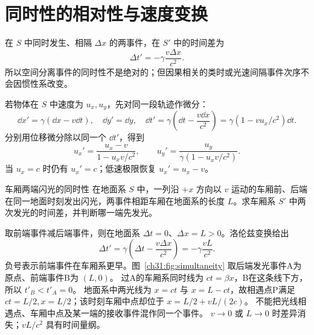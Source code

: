 
\section{同时性的相对性与速度变换}

在 $S$ 中同时发生、相隔 $\Delta x$ 的两事件，在 $S'$ 中的时间差为
\begin{equation}
 \Delta t'=-\gamma\frac{v\Delta x}{c^2}.
\end{equation}
所以空间分离事件的同时性不是绝对的；但因果相关的类时或光速间隔事件次序不会因惯性系改变。

若物体在 $S$ 中速度为 $u_x,u_y$，先对同一段轨迹作微分：
\[
 \dd x'=\gamma(\dd x-v\dd t),\quad
 \dd y'=\dd y,\quad
 \dd t'=\gamma\left(\dd t-\frac{v\dd x}{c^2}\right)
 =\gamma(1-vu_x/c^2)\dd t.
\]
分别用位移微分除以同一个 $\dd t'$，得到
\begin{equation}
 u_x'=\frac{u_x-v}{1-u_xv/c^2},\qquad
 u_y'=\frac{u_y}{\gamma(1-u_xv/c^2)}.
\end{equation}
当 $u_x=c$ 时仍有 $u_x'=c$；低速极限恢复 $u_x'=u_x-v$。

\begin{origexamplebox}{车厢两端闪光的同时性}
在地面系 $S$ 中，一列沿 $+x$ 方向以 $v$ 运动的车厢前、后端在同一地面时刻发出闪光，两事件相距车厢在地面系的长度 $L$。求车厢系 $S'$ 中两次发光的时间差，并判断哪一端先发光。
\begin{center}

\label{ch31:fig:train-question}
\end{center}
\end{origexamplebox}
\begin{xesolution}
\begin{center}

\label{ch31:fig:simultaneity}
\end{center}


取前端事件减后端事件，则在地面系 $\Delta t=0$、$\Delta x=L>0$。洛伦兹变换给出
\[
 \Delta t'=\gamma\left(\Delta t-\frac{v\Delta x}{c^2}\right)
 =\boxed{-\gamma\frac{vL}{c^2}}.
\]
负号表示前端事件在车厢系更早。图~\ref{ch31:fig:simultaneity} 取后端发光事件A为原点、前端事件B为 $(L,0)$。
过A的车厢系同时线为 $ct=\beta x$，B在这条线下方，所以 $t'_B<t'_A=0$。
地面系中两光线为 $x=ct$ 与 $x=L-ct$，故相遇点P满足 $ct=L/2,x=L/2$；该时刻车厢中点却位于 $x=L/2+vL/(2c)$。
不能把光线相遇点、车厢中点及某一端的接收事件混作同一个事件。
$v\to0$ 或 $L\to0$ 时差异消失；$vL/c^2$ 具有时间量纲。
\end{xesolution}

